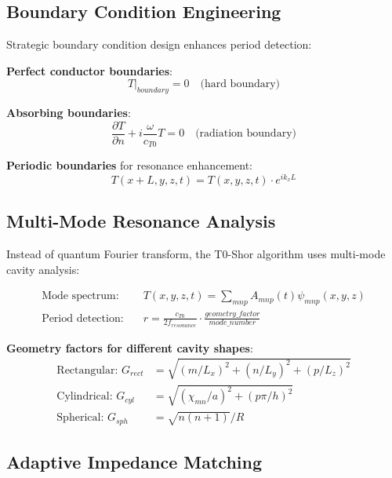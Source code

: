 \documentclass[12pt,a4paper]{article}
\begin{document}
	\subsection{Boundary Condition Engineering}
	
	Strategic boundary condition design enhances period detection:
	
	\textbf{Perfect conductor boundaries}:
	\begin{equation}
		T|_{boundary} = 0 \quad \text{(hard boundary)}
	\end{equation}
	
	\textbf{Absorbing boundaries}:
	\begin{equation}
		\frac{\partial T}{\partial n} + i\frac{\omega}{c_{T0}} T = 0 \quad \text{(radiation boundary)}
	\end{equation}
	
	\textbf{Periodic boundaries} for resonance enhancement:
	\begin{equation}
		T(x + L, y, z, t) = T(x, y, z, t) \cdot e^{i k_x L}
	\end{equation}
	
	\subsection{Multi-Mode Resonance Analysis}
	
	Instead of quantum Fourier transform, the T0-Shor algorithm uses multi-mode cavity analysis:
	
	\begin{align}
		\text{Mode spectrum}: \quad &T(x,y,z,t) = \sum_{mnp} A_{mnp}(t) \psi_{mnp}(x,y,z) \\
		\text{Period detection}: \quad &r = \frac{c_{T0}}{2f_{resonance}} \cdot \frac{geometry\_factor}{mode\_number}
	\end{align}
	
	\textbf{Geometry factors for different cavity shapes}:
	\begin{align}
		\text{Rectangular: } G_{rect} &= \sqrt{(m/L_x)^2 + (n/L_y)^2 + (p/L_z)^2} \\
		\text{Cylindrical: } G_{cyl} &= \sqrt{(\chi_{mn}/a)^2 + (p\pi/h)^2} \\
		\text{Spherical: } G_{sph} &= \sqrt{n(n+1)}/R
	\end{align}
	
	\subsection{Adaptive Impedance Matching}
	
\end{document}
